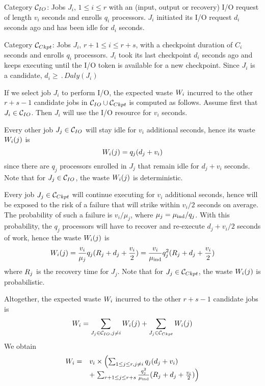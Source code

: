 \begin{compactitem}
\item Category \IOcat $\mathcal{C}_{IO}$: Jobs $J_{i}$, $1\leq i \leq r$ with an
  (input, output or recovery) I/O request of length $v_{i}$ seconds and enrolls $q_{i}$
  processors. $J_{i}$ initiated its I/O request $d_{i}$ seconds ago and has been idle
  for $d_{i}$ seconds.

\item Category \Ckptcat $\mathcal{C}_{Ckpt}$: Jobs $J_{i}$, $r+1\leq i \leq r+s$,
  with a checkpoint duration of $C_{i}$ seconds and enrolls $q_{i}$ processors.
  $J_{i}$ took its last checkpoint $d_{i}$ seconds ago and keeps executing until the
  I/O token is available for a new checkpoint. Since $J_{i}$ is a candidate,
  $d_{i} \geq \period{Daly}(J_{i})$
\end{compactitem}


If we select job $J_{i}$ to perform I/O, the expected waste $W_{i}$
incurred to the other $r+s-1$ candidate jobs in  $\mathcal{C}_{IO} \cup
\mathcal{C}_{Ckpt}$ is computed as follows. Assume first that $J_{i} \in \mathcal{C}_{IO}$.
Then  $J_{i}$ will use the I/O resource for $v_{i}$ seconds.
\begin{compactitem}
%
  \item Every other job $J_{j} \in \mathcal{C}_{IO}$ will stay idle for $v_{i}$
  additional seconds, hence its waste $W_{i}(j)$ is $$W_{i}(j) = q_{j}
  (d_{j} + v_{i})$$ since there are $q_{j}$ processors enrolled in $J_{j}$ that
  remain idle for $d_{j} + v_{i}$ seconds. Note that for $J_{j} \in \mathcal{C}_{IO}$, the
  waste $W_{i}(j)$ is deterministic.
%
  \item Every job $J_{j} \in \mathcal{C}_{Ckpt}$ will continue executing for
  $v_{i}$ additional seconds, hence will be exposed to the risk of a failure
  that will strike within $v_{i}/2$ seconds on average. The probability of such
  a failure is $v_{i}/\mu_{j}$, where $\mu_{j} =
  \mu_{\text{ind}}/q_{j}$. With this
  probability, the $q_{j}$ processors will have to recover and re-execute $d_{j} +
  v_{i}/2$ seconds of work, hence the waste $W_{i}(j)$ is $$W_{i}(j) =
  \frac{v_{i}}{\mu_{j} } q_{j} (R_{j} + d_{j} + \frac{v_{i}}{2}) =
  \frac{v_{i}}{\mu_{\text{ind}}} q^{2}_{j} (R_{j} + d_{j} + \frac{v_{i}}{2})$$ where
  $R_{j}$ is the recovery time for $J_{j}$. Note that for $J_{j} \in
  \mathcal{C}_{Ckpt}$, the waste $W_{i}(j)$ is probabilistic.
%
 \end{compactitem}
 Altogether, the expected waste $W_{i}$ incurred
to the other $r+s-1$ candidate jobs is
$$W_{i} = \sum_{J_{j} \in \mathcal{C}_{IO}, j\neq i} W_{i}(j) + \sum_{J_{j} \in \mathcal{C}_{Ckpt}} W_{i}(j)$$
We obtain
\begin{equation}
\label{eq.selection}
\begin{array}{ll}
 W_{i} = & v_{i} \times \left( \sum_{1 \leq j \leq r, j\neq i} q_{j} (d_{j} + v_{i}) \right.\\
& + \left. \sum_{r+1 \leq j \leq r+s}   \frac{q^{2}_{j}}{\mu_{\text{ind}}} (R_{j} + d_{j} + \frac{v_{i}}{2}) \right)
 \end{array}
\end{equation}

